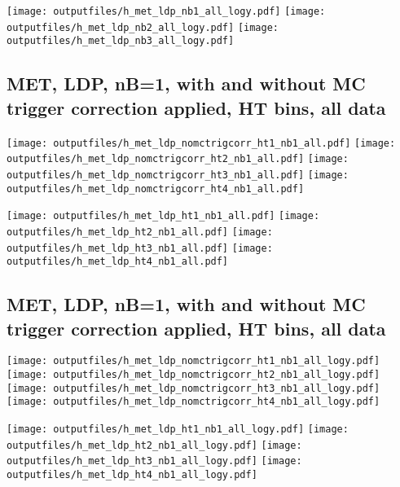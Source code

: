 \documentclass[11pt]{article}
\begin{document}
    \noindent
     \texttt{[image: outputfiles/h\_met\_ldp\_nb1\_all\_logy.pdf]}
     \texttt{[image: outputfiles/h\_met\_ldp\_nb2\_all\_logy.pdf]}
     \texttt{[image: outputfiles/h\_met\_ldp\_nb3\_all\_logy.pdf]}


     \subsection{ MET, LDP, nB=1, with and without MC trigger correction applied, HT bins, all data}

    \noindent
     \texttt{[image: outputfiles/h\_met\_ldp\_nomctrigcorr\_ht1\_nb1\_all.pdf]}
     \texttt{[image: outputfiles/h\_met\_ldp\_nomctrigcorr\_ht2\_nb1\_all.pdf]}
     \texttt{[image: outputfiles/h\_met\_ldp\_nomctrigcorr\_ht3\_nb1\_all.pdf]}
     \texttt{[image: outputfiles/h\_met\_ldp\_nomctrigcorr\_ht4\_nb1\_all.pdf]}

    \noindent
     \texttt{[image: outputfiles/h\_met\_ldp\_ht1\_nb1\_all.pdf]}
     \texttt{[image: outputfiles/h\_met\_ldp\_ht2\_nb1\_all.pdf]}
     \texttt{[image: outputfiles/h\_met\_ldp\_ht3\_nb1\_all.pdf]}
     \texttt{[image: outputfiles/h\_met\_ldp\_ht4\_nb1\_all.pdf]}

    \clearpage
     \subsection{ MET, LDP, nB=1, with and without MC trigger correction applied, HT bins, all data}

    \noindent
     \texttt{[image: outputfiles/h\_met\_ldp\_nomctrigcorr\_ht1\_nb1\_all\_logy.pdf]}
     \texttt{[image: outputfiles/h\_met\_ldp\_nomctrigcorr\_ht2\_nb1\_all\_logy.pdf]}
     \texttt{[image: outputfiles/h\_met\_ldp\_nomctrigcorr\_ht3\_nb1\_all\_logy.pdf]}
     \texttt{[image: outputfiles/h\_met\_ldp\_nomctrigcorr\_ht4\_nb1\_all\_logy.pdf]}

    \noindent
     \texttt{[image: outputfiles/h\_met\_ldp\_ht1\_nb1\_all\_logy.pdf]}
     \texttt{[image: outputfiles/h\_met\_ldp\_ht2\_nb1\_all\_logy.pdf]}
     \texttt{[image: outputfiles/h\_met\_ldp\_ht3\_nb1\_all\_logy.pdf]}
     \texttt{[image: outputfiles/h\_met\_ldp\_ht4\_nb1\_all\_logy.pdf]}
\end{document}

